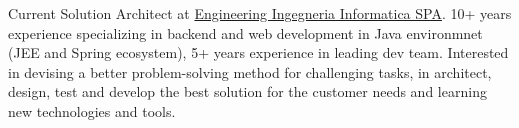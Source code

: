 

\begin{cvparagraph}

Current Solution Architect at \href{https://www.eng.it/}{Engineering Ingegneria Informatica SPA}. 10+ years experience specializing in backend and web development in Java environmnet (JEE and Spring ecosystem), 5+ years experience in leading dev team. Interested in devising a better problem-solving method for challenging tasks, in architect, design, test and develop the best solution for the customer needs and learning new technologies and tools.

\end{cvparagraph}